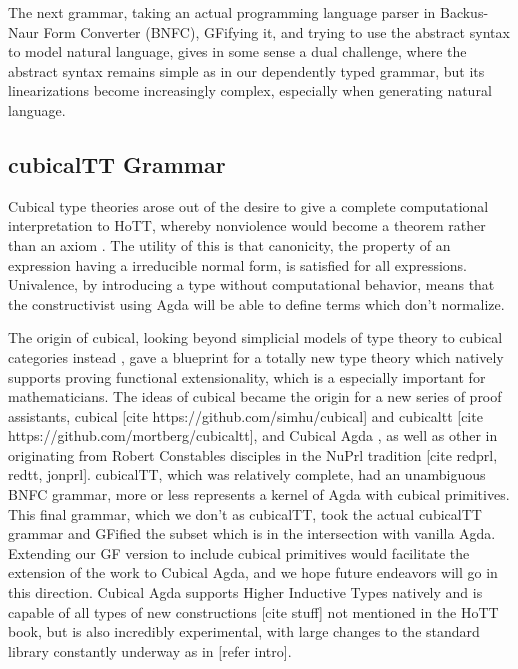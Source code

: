 The next grammar, taking an actual programming language
parser in Backus-Naur Form Converter (BNFC), GFifying it, and trying to use the
abstract syntax to model natural language, gives in some sense a dual challenge,
where the abstract syntax remains simple as in our dependently typed grammar,
but its linearizations become increasingly complex, especially when generating
natural language.

\subsection{cubicalTT Grammar}

Cubical type theories arose out of the desire to give a complete computational
interpretation to HoTT, whereby nonviolence would become a theorem rather than
an axiom \cite{cohen:hal-01378906}. The utility of this is that canonicity, the
property of an expression having a irreducible normal form, is satisfied for all
expressions. Univalence, by introducing a type without computational behavior,
means that the constructivist using Agda will be able to define terms which
don't normalize.

The origin of cubical, looking beyond simplicial models of type theory to
cubical categories instead \cite{bezem2017univalence}, gave a blueprint for a
totally new type theory which natively supports proving functional
extensionality, which is a especially important for mathematicians. The ideas of
cubical became the origin for a new series of proof assistants, cubical [cite
https://github.com/simhu/cubical] and cubicaltt [cite
https://github.com/mortberg/cubicaltt], and Cubical Agda \cite{cubicalAgda}, as
well as other in originating from Robert Constables disciples in the NuPrl
tradition [cite redprl, redtt, jonprl]. cubicalTT, which was relatively
complete, had an unambiguous BNFC grammar, more or less represents a kernel of
Agda with cubical primitives. This final grammar, which we don't as cubicalTT,
took the actual cubicalTT grammar and GFified the subset which is in the
intersection with vanilla Agda. Extending our GF version to include cubical
primitives would facilitate the extension of the work to Cubical Agda, and we
hope future endeavors will go in this direction. Cubical Agda
supports Higher Inductive Types natively and is capable of all types of new
constructions [cite stuff] not mentioned in the HoTT book, but is also
incredibly experimental, with large changes to the standard library constantly
underway as in [refer intro].

